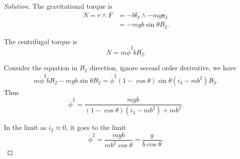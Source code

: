 \begin{proof}[Solution]
	The gravitational torque is
	\begin{align*}
		N = r \wedge F
		&= - b \mathsf{f}_3 \wedge - m g \mathsf{e}_3 \\
		&= -m g b \sin \theta I \mathsf{f}_2
	.\end{align*}

	The centrifugal torque is
	\[
		N = m \dot{\phi}^2 b I \mathsf{f}_2
	.\] 

	Consider the equation in $I \mathsf{f}_2$ direction, ignore second order derivative, we have
	\begin{align*}
		 m \dot{\phi}^2 b I \mathsf{f}_2 - m g b \sin \theta I \mathsf{f}_2 = \dot{\phi}^2 (1 - \cos \theta) \sin \theta(i_3 - m b^2) I \mathsf{f}_2
	.\end{align*}
	Thus
	\[
		\dot{\phi}^2 = \frac{m g b}{(1 - \cos \theta) (i_3 - m b^2)+ m b^2}
	.\] 

	In the limit as $i_3 \approx 0$, it goes to the limit
	\[
		\dot{\phi}^2 = \frac{m g b}{m b^2 \cos \theta} = \frac{g}{b \cos \theta}
	.\] 






	
\end{proof}




